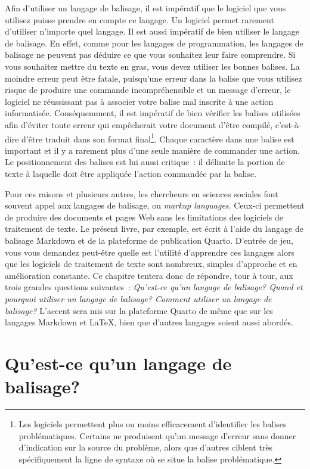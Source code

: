 \documentclass[
  letterpaper,
]{scrbook}
\begin{document}
Afin d'utiliser un langage de balisage, il est impératif que le logiciel
que vous utilisez puisse prendre en compte ce langage. Un logiciel
permet rarement d'utiliser n'importe quel langage. Il est aussi
impératif de bien utiliser le langage de balisage. En effet, comme pour
les langages de programmation, les langages de balisage ne peuvent pas
déduire ce que vous souhaitez leur faire comprendre. Si vous souhaitez
mettre du texte en gras, vous devez utiliser les bonnes balises. La
moindre erreur peut être fatale, puisqu'une erreur dans la balise que
vous utilisez risque de produire une commande incompréhensible et un
message d'erreur, le logiciel ne réussissant pas à associer votre balise
mal inscrite à une action informatisée. Conséquemment, il est impératif
de bien vérifier les balises utilisées afin d'éviter toute erreur qui
empêcherait votre document d'être compilé, c'est-à-dire d'être traduit
dans son format final\footnote{Les logiciels permettent plus ou moins
  efficacement d'identifier les balises problématiques. Certains ne
  produisent qu'un message d'erreur sans donner d'indication sur la
  source du problème, alors que d'autres ciblent très spécifiquement la
  ligne de syntaxe où se situe la balise problématique.}. Chaque
caractère dans une balise est important et il y a rarement plus d'une
seule manière de commander une action. Le positionnement des balises est
lui aussi critique~: il délimite la portion de texte à laquelle doit
être appliquée l'action commandée par la balise.

Pour ces raisons et plusieurs autres, les chercheurs en sciences
sociales font souvent appel aux langages de balisage, ou \emph{markup
languages}. Ceux-ci permettent de produire des documents et pages Web
sans les limitations des logiciels de traitement de texte. Le présent
livre, par exemple, est écrit à l'aide du langage de balisage Markdown
et de la plateforme de publication Quarto. D'entrée de jeu, vous vous
demandez peut-être quelle est l'utilité d'apprendre ces langages alors
que les logiciels de traitement de texte sont nombreux, simples
d'approche et en amélioration constante. Ce chapitre tentera donc de
répondre, tour à tour, aux trois grandes questions suivantes~:
\emph{Qu'est-ce qu'un langage de balisage? Quand et pourquoi utiliser un
langage de balisage? Comment utiliser un langage de balisage?} L'accent
sera mis sur la plateforme Quarto de même que sur les langages Markdown
et \LaTeX, bien que d'autres langages soient aussi abordés.

\hypertarget{quest-ce-quun-langage-de-balisage-1}{%
\section{Qu'est-ce qu'un langage de
balisage?}\label{quest-ce-quun-langage-de-balisage-1}}
\end{document}
